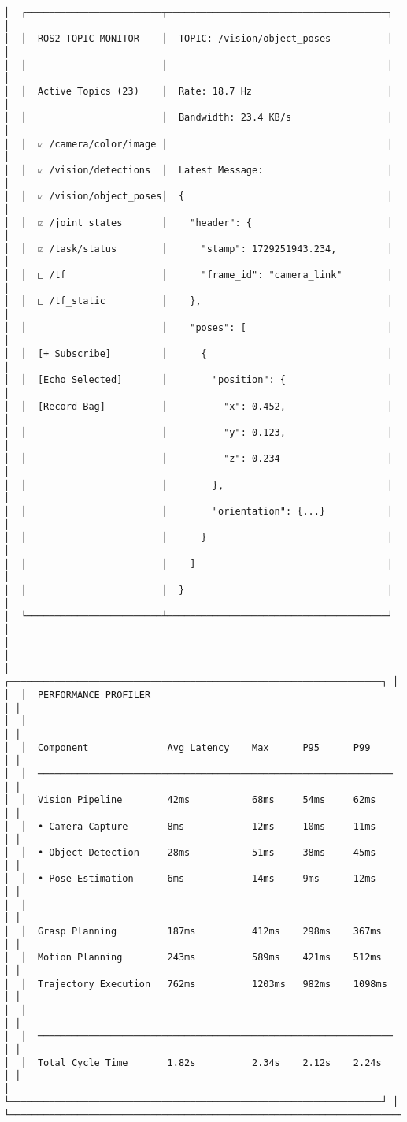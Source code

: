 \documentclass[
]{article}
\begin{document}
\begin{verbatim}
│  ┌────────────────────────┬───────────────────────────────────────┐   │
│  │  ROS2 TOPIC MONITOR    │  TOPIC: /vision/object_poses          │   │
│  │                        │                                       │   │
│  │  Active Topics (23)    │  Rate: 18.7 Hz                        │   │
│  │                        │  Bandwidth: 23.4 KB/s                 │   │
│  │  ☑ /camera/color/image │                                       │   │
│  │  ☑ /vision/detections  │  Latest Message:                      │   │
│  │  ☑ /vision/object_poses│  {                                    │   │
│  │  ☑ /joint_states       │    "header": {                        │   │
│  │  ☑ /task/status        │      "stamp": 1729251943.234,         │   │
│  │  □ /tf                 │      "frame_id": "camera_link"        │   │
│  │  □ /tf_static          │    },                                 │   │
│  │                        │    "poses": [                         │   │
│  │  [+ Subscribe]         │      {                                │   │
│  │  [Echo Selected]       │        "position": {                  │   │
│  │  [Record Bag]          │          "x": 0.452,                  │   │
│  │                        │          "y": 0.123,                  │   │
│  │                        │          "z": 0.234                   │   │
│  │                        │        },                             │   │
│  │                        │        "orientation": {...}           │   │
│  │                        │      }                                │   │
│  │                        │    ]                                  │   │
│  │                        │  }                                    │   │
│  └────────────────────────┴───────────────────────────────────────┘   │
│                                                                        │
│  ┌──────────────────────────────────────────────────────────────────┐ │
│  │  PERFORMANCE PROFILER                                            │ │
│  │                                                                   │ │
│  │  Component              Avg Latency    Max      P95      P99     │ │
│  │  ─────────────────────────────────────────────────────────────── │ │
│  │  Vision Pipeline        42ms           68ms     54ms     62ms    │ │
│  │  • Camera Capture       8ms            12ms     10ms     11ms    │ │
│  │  • Object Detection     28ms           51ms     38ms     45ms    │ │
│  │  • Pose Estimation      6ms            14ms     9ms      12ms    │ │
│  │                                                                   │ │
│  │  Grasp Planning         187ms          412ms    298ms    367ms   │ │
│  │  Motion Planning        243ms          589ms    421ms    512ms   │ │
│  │  Trajectory Execution   762ms          1203ms   982ms    1098ms  │ │
│  │                                                                   │ │
│  │  ─────────────────────────────────────────────────────────────── │ │
│  │  Total Cycle Time       1.82s          2.34s    2.12s    2.24s   │ │
│  └──────────────────────────────────────────────────────────────────┘ │
└────────────────────────────────────────────────────────────────────────┘
\end{verbatim}
\end{document}
